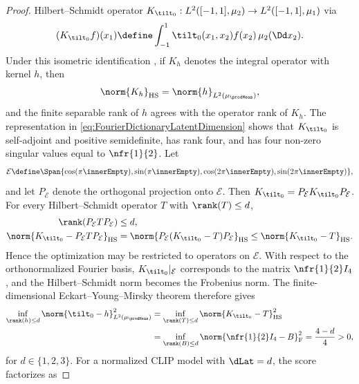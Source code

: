 \documentclass{article}
\begin{document}
\begin{proof}
 Hilbert--Schmidt operator
 $K_{\tilt_0}:L^2([-1,1],\mu_2)\to L^2([-1,1],\mu_1)$ via
 \begin{align*}
  (K_{\tilt_0}f)(x_1)
  \define\int_{-1}^1\tilt_0(x_1,x_2)f(x_2)\,\mu_2(\Dd x_2).
 \end{align*}
 Under this isometric identification
  \cite[Thm. VI.6.3]{wernerFunktionalanalysis2011},
 if $K_h$ denotes the integral operator with kernel $h$, then
 \begin{align*}
  \norm{K_h}_{\mathrm{HS}}
  =\norm{h}_{L^2(\mu_\prodMeas)},
 \end{align*}
 and the finite separable rank of $h$ agrees with the operator rank of $K_h$.
 The representation in \eqref{eq:FourierDictionaryLatentDimension} shows
 that $K_{\tilt_0}$ is self-adjoint and positive semidefinite, has rank
 four, and has four non-zero singular values equal to $\nfr{1}{2}$.
 Let
 \begin{align*}
  \mathcal E\define\Span\{
  \cos(\pi\innerEmpty),\sin(\pi\innerEmpty),
  \cos(2\pi\innerEmpty),\sin(2\pi\innerEmpty)\},
 \end{align*}
 and let $P_{\mathcal E}$ denote the orthogonal projection onto $\mathcal E$.
 Then $K_{\tilt_0}=P_{\mathcal E}K_{\tilt_0}P_{\mathcal E}$. For every
 Hilbert--Schmidt operator $T$ with $\rank(T)\leq d$,
 \begin{align*}
  \rank(P_{\mathcal E}TP_{\mathcal E}) & \leq d,                                                           \\
  \norm{K_{\tilt_0}-P_{\mathcal E}TP_{\mathcal E}}_{\mathrm{HS}}
                                       & =\norm{P_{\mathcal E}(K_{\tilt_0}-T)P_{\mathcal E}}_{\mathrm{HS}}
  \leq\norm{K_{\tilt_0}-T}_{\mathrm{HS}}.
 \end{align*}
 Hence the optimization may be restricted to operators on $\mathcal E$.
 With respect to the orthonormalized Fourier basis,
 $K_{\tilt_0}|_{\mathcal E}$ corresponds to the matrix
 $\nfr{1}{2}I_4$, and the Hilbert--Schmidt norm becomes the Frobenius norm.
 The finite-dimensional Eckart--Young--Mirsky theorem
  \citep{eckartApproximationOneMatrix1936} therefore gives
 \begin{align*}
  \inf_{\rank(h)\leq d}\norm{\tilt_0-h}_{L^2(\mu_\prodMeas)}^2
   & =\inf_{\rank(T)\leq d}\norm{K_{\tilt_0}-T}_{\mathrm{HS}}^2  \\
   & =\inf_{\rank(B)\leq d}\norm{\nfr{1}{2}I_4-B}_{\mathrm{F}}^2
  =\frac{4-d}{4}>0,
 \end{align*}
 for $d \in \{1,2,3\}$.
 For a normalized CLIP model with $\dLat=d$, the score factorizes as

\end{proof}
\end{document}
